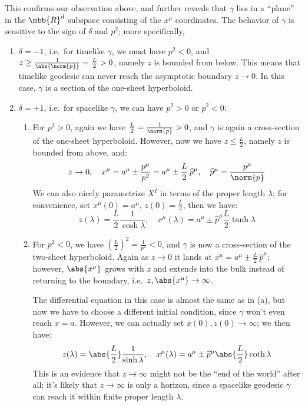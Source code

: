 \documentclass[a4paper,10pt]{article}
\begin{document}
	This confirms our observation above, and further reveals that $\gamma$ lies in a ``plane'' in the $\mbb{R}^d$ subspace consisting of the $x^\mu$ coordinates. The behavior of $\gamma$ is sensitive to the sign of $\delta$ and $p^2$; more specifically,
	\begin{enumerate}
	\item $\delta = -1$, i.e.~for timelike $\gamma$, we must have $p^2 < 0$, and $z \ge \frac{1}{\abs{\norm{p}}} = \frac{L}{2} > 0$, namely $z$ is bounded from below. This means that timelike geodesic can never reach the asymptotic boundary $z \to 0$. In this case, $\gamma$ is a section of the one-sheet hyperboloid. 
	\item $\delta = +1$, i.e.~for spacelike $\gamma$, we can have $p^2 > 0$ or $p^2 < 0$.
		\begin{enumerate}
		\item For $p^2 > 0$, again we have $\frac{L}{2} = \frac{1}{\norm{p}} > 0$, and $\gamma$ is again a cross-section of the one-sheet hyperboloid. However, now we have $z \le \frac{L}{2}$, namely $z$ is bounded from above, and:
		\begin{equation}
			z\to 0,
		\quad
			x^\mu
			= a^\mu \pm \frac{p^\mu}{p^2}
			= a^\mu \pm \frac{L}{2}\,\widehat{p}^\mu,
		\quad
			\widehat{p}^\mu = \frac{p^\mu}{\norm{p}}
		\end{equation}
		We can also nicely parametrize $X^I$ in terms of the proper length $\lambda$; for convenience, set $x^\mu(0) = a^\mu$, $z(0) = \frac{L}{2}$, then we have:
		\begin{equation}
			z(\lambda)
			= \frac{L}{2} \frac{1}{\cosh \lambda},
		\quad
			x^\mu(\lambda)
			= a^\mu \pm \widehat{p}^\mu \frac{L}{2}
				\tanh \lambda
		\label{eq:elliptic}
		\end{equation}
		
		\item For $p^2 < 0$, we have $(\frac{L}{2})^2 = \frac{1}{p^2} < 0$, and $\gamma$ is now a cross-section of the two-sheet hyperboloid. Again as $z\to 0$ it lands at $x^\mu = a^\mu \pm \frac{L}{2}\,\widehat{p}^\mu$; however, $\abs{x^\mu}$ grows with $z$ and extends into the bulk instead of returning to the boundary, i.e.~$z,\abs{x^\mu} \to \infty$. 
		
		The differential equation in this case is almost the same as in (a), but now we have to choose a different initial condition, since $\gamma$ won't even reach $x = a$. However, we can actually set $x(0),z(0) \to \infty$; we then have:
		\begin{equation}
			z(\lambda)
			= \abs{\frac{L}{2}} \frac{1}{\sinh \lambda},
		\quad
			x^\mu(\lambda)
			= a^\mu \pm \widehat{p}^\mu \abs{\frac{L}{2}}
				\coth \lambda
		\label{eq:hyperbolic}
		\end{equation}
		This is an evidence that $z\to\infty$ might not be the ``end of the world'' after all; it's likely that $z\to\infty$ is only a horizon, since a spacelike geodesic $\gamma$ can reach it within finite proper length $\lambda$. 
		
		\end{enumerate}
	
	\end{enumerate}
	
\end{document}

